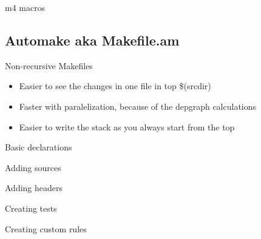 \documentclass{beamer}
\begin{document}
\begin{frame}[t]{m4 macros}
	\begin{small}
	
	\end{small}
\end{frame}

\subsection{Automake aka Makefile.am}

\begin{frame}[t]{Non-recursive Makefiles}
	\begin{itemize}
	\item Easier to see the changes in one file in top \$(srcdir)
	\item Faster with paralelization, because of the depgraph calculations
	\item Easier to write the stack as you always start from the top
	\end{itemize}
\end{frame}

\begin{frame}[t]{Basic declarations}
	\begin{small}
	
	\end{small}
\end{frame}

\begin{frame}[t]{Adding sources}
	\begin{small}
	
	\end{small}
\end{frame}

\begin{frame}[t]{Adding headers}
	\begin{small}
	
	\end{small}
\end{frame}

\begin{frame}[t]{Creating tests}
	\begin{small}
	
	\end{small}
\end{frame}

\begin{frame}[t]{Creating custom rules}
	\begin{small}
	
	\end{small}
\end{frame}
\end{document}
